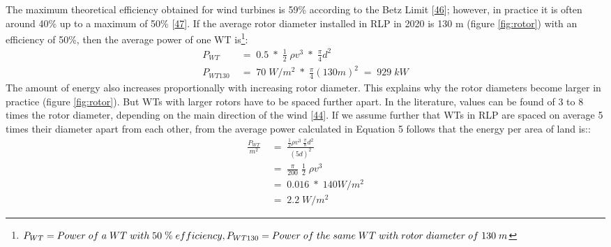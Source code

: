 \documentclass[a4paper,11pt]{article}
\begin{document}
The maximum theoretical efficiency obtained for wind turbines is 59\% according to the Betz Limit {[}\protect\hyperlink{ref-A.Betz.1920}{46}{]}; however, in practice it is often around 40\% up to a maximum of 50\% {[}\protect\hyperlink{ref-WindwartsEnergieausdemNorden.2021}{47}{]}. If the average rotor diameter installed in RLP in 2020 is 130 m (figure \ref{fig:rotor}) with an efficiency of 50\%, then the average power of one WT is\footnote{\(P_{WT}=Power\; of\; a\; WT\; with\; 50\; \%\; efficiency,\;\\ P_{WT130}=Power\; of\; the\; same\; WT\; with\; rotor\; diameter\; of\; 130\; m\)}:
\begin{equation}
\begin{split}
P_{WT}\; & =\; 0.5\; *\; \frac{1}{2}\; \rho v^3\; *\; \frac{\pi}{4}d^2 \\
P_{WT130}\; & =\; 70\; W/m^2\; *\; \frac{\pi}{4}(130 m)^2\; =\; 929\; kW
\end{split}
\end{equation}
The amount of energy also increases proportionally with increasing rotor diameter. This explains why the rotor diameters become larger in practice (figure \ref{fig:rotor}). But WTs with larger rotors have to be spaced further apart. In the literature, values can be found of 3 to 8 times the rotor diameter, depending on the main direction of the wind {[}\protect\hyperlink{ref-DavidJCMacKay.2009}{44}{]}. If we assume further that WTs in RLP are spaced on average 5 times their diameter apart from each other, from the average power calculated in Equation 5 follows that the energy per area of land is::
\begin{equation}
\begin{split}
\frac{P_{WT}}{m^2}\; & =\; \frac{\frac{1}{2} \rho v^3\; \frac{\pi}{8}d^2}{(5d)^2} \\
 & =\; \frac{\pi}{200}\; \frac{1}{2}\; \rho v^3 \\
 & =\; 0.016\; *\; 140 W/m^2 \\
 & =\; 2.2\; W/m^2
\end{split}
\end{equation}
\end{document}
